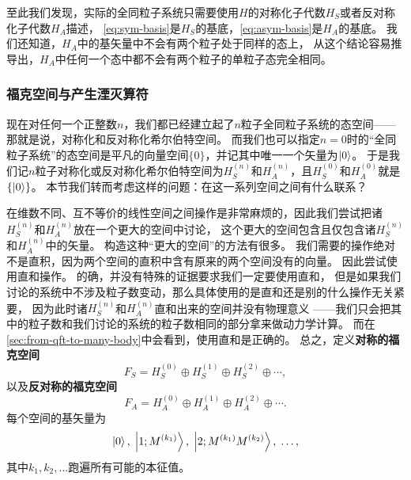 \documentclass[UTF8, a4paper]{ctexart}
\begin{document}
至此我们发现，实际的全同粒子系统只需要使用$H$的对称化子代数$H_S$或者反对称化子代数$H_A$描述，
\eqref{eq:sym-basis}是$H_S$的基底，\eqref{eq:asym-basis}是$H_A$的基底。
我们还知道，$H_A$中的基矢量中不会有两个粒子处于同样的态上，
从这个结论容易推导出，$H_A$中任何一个态中都不会有两个粒子的单粒子态完全相同。

\subsubsection{福克空间与产生湮灭算符}
现在对任何一个正整数$n$，我们都已经建立起了$n$粒子全同粒子系统的态空间——那就是说，对称化和反对称化希尔伯特空间。
而我们也可以指定$n=0$时的“全同粒子系统”的态空间是平凡的向量空间$\{0\}$，并记其中唯一一个矢量为$\ket{0}$。
于是我们记$n$粒子对称化或反对称化希尔伯特空间为$H_S^{(n)}$和$H_A^{(n)}$，且$H_S^{(0)}$和$H_A^{(0)}$就是$\{\ket{0}\}$。
本节我们转而考虑这样的问题：在这一系列空间之间有什么联系？

在维数不同、互不等价的线性空间之间操作是非常麻烦的，因此我们尝试把诸$H_S^{(n)}$和$H_A^{(n)}$放在一个更大的空间中讨论，
这个更大的空间包含且仅包含诸$H_S^{(n)}$和$H_A^{(n)}$中的矢量。
构造这种“更大的空间”的方法有很多。
我们需要的操作绝对不是直积，因为两个空间的直积中含有原来的两个空间没有的向量。
因此尝试使用直和操作。
的确，并没有特殊的证据要求我们一定要使用直和，
但是如果我们讨论的系统中不涉及粒子数变动，那么具体使用的是直和还是别的什么操作无关紧要，
因为此时诸$H_S^{(n)}$和$H_A^{(n)}$直和出来的空间并没有物理意义
——我们只会把其中的粒子数和我们讨论的系统的粒子数相同的部分拿来做动力学计算。
而在\autoref{sec:from-qft-to-many-body}中会看到，使用直和是正确的。
总之，定义\textbf{对称的福克空间}
\[
    F_S = H_S^{(0)} \oplus H_S^{(1)} \oplus H_S^{(2)} \oplus \cdots,
\]
以及\textbf{反对称的福克空间}
\[
    F_A = H_A^{(0)} \oplus H_A^{(1)} \oplus H_A^{(2)} \oplus \cdots.
\]
每个空间的基矢量为
\[
    \ket{0}, \; \ket{1;M^{(k_1)}}, \; \ket{2;M^{(k_1)} M^{(k_2)}}, \; \ldots,
\]
其中$k_1, k_2, \ldots$跑遍所有可能的本征值。
\end{document}
